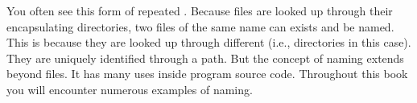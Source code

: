 You often see this form of repeated . Because files are looked up through their encapsulating directories, two files of the same name can exists and be named. This is because they are looked up through different  (i.e., directories in this case). They are uniquely identified through a path. But the concept of naming extends beyond files. It has many uses inside program source code. Throughout this book you will encounter numerous examples of naming.

